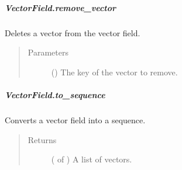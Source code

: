 \documentclass[letterpaper,10pt,english]{sphinxmanual}
\begin{document}
\begin{fulllineitems}
\begin{fulllineitems}
\end{fulllineitems}



\subparagraph{VectorField.remove\_vector}
\label{\detokenize{api/generated/directional_clustering.fields.VectorField.remove_vector:vectorfield-remove-vector}}\label{\detokenize{api/generated/directional_clustering.fields.VectorField.remove_vector::doc}}

\begin{fulllineitems}
\label{\detokenize{api/generated/directional_clustering.fields.VectorField.remove_vector:directional_clustering.fields.VectorField.remove_vector}}
Deletes a vector from the vector field.
\begin{quote}\begin{description}
\item[{Parameters}] \leavevmode
{} () \textendash{} The key of the vector to remove.

\end{description}\end{quote}

\end{fulllineitems}



\subparagraph{VectorField.to\_sequence}
\label{\detokenize{api/generated/directional_clustering.fields.VectorField.to_sequence:vectorfield-to-sequence}}\label{\detokenize{api/generated/directional_clustering.fields.VectorField.to_sequence::doc}}

\begin{fulllineitems}
\label{\detokenize{api/generated/directional_clustering.fields.VectorField.to_sequence:directional_clustering.fields.VectorField.to_sequence}}
Converts a vector field into a sequence.
\begin{quote}\begin{description}
\item[{Returns}] \leavevmode
{} ( of ) \textendash{} A list of vectors.


\end{description}
\end{quote}
\end{fulllineitems}
\end{fulllineitems}
\end{document}
